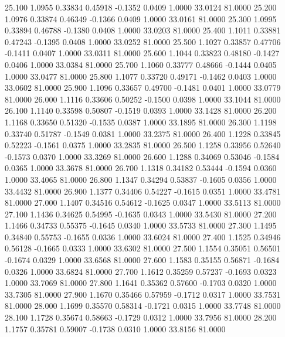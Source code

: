   25.100   1.0955   0.33834   0.45918  -0.1352   0.0409   1.0000  33.0124  81.0000
  25.200   1.0976   0.33874   0.46349  -0.1366   0.0409   1.0000  33.0161  81.0000
  25.300   1.0995   0.33894   0.46788  -0.1380   0.0408   1.0000  33.0203  81.0000
  25.400   1.1011   0.33881   0.47243  -0.1395   0.0408   1.0000  33.0252  81.0000
  25.500   1.1027   0.33857   0.47706  -0.1411   0.0407   1.0000  33.0311  81.0000
  25.600   1.1044   0.33823   0.48180  -0.1427   0.0406   1.0000  33.0384  81.0000
  25.700   1.1060   0.33777   0.48666  -0.1444   0.0405   1.0000  33.0477  81.0000
  25.800   1.1077   0.33720   0.49171  -0.1462   0.0403   1.0000  33.0602  81.0000
  25.900   1.1096   0.33657   0.49700  -0.1481   0.0401   1.0000  33.0779  81.0000
  26.000   1.1116   0.33606   0.50252  -0.1500   0.0398   1.0000  33.1044  81.0000
  26.100   1.1140   0.33598   0.50807  -0.1519   0.0393   1.0000  33.1428  81.0000
  26.200   1.1168   0.33650   0.51320  -0.1535   0.0387   1.0000  33.1895  81.0000
  26.300   1.1198   0.33740   0.51787  -0.1549   0.0381   1.0000  33.2375  81.0000
  26.400   1.1228   0.33845   0.52223  -0.1561   0.0375   1.0000  33.2835  81.0000
  26.500   1.1258   0.33956   0.52640  -0.1573   0.0370   1.0000  33.3269  81.0000
  26.600   1.1288   0.34069   0.53046  -0.1584   0.0365   1.0000  33.3678  81.0000
  26.700   1.1318   0.34182   0.53444  -0.1594   0.0360   1.0000  33.4065  81.0000
  26.800   1.1347   0.34294   0.53837  -0.1605   0.0356   1.0000  33.4432  81.0000
  26.900   1.1377   0.34406   0.54227  -0.1615   0.0351   1.0000  33.4781  81.0000
  27.000   1.1407   0.34516   0.54612  -0.1625   0.0347   1.0000  33.5113  81.0000
  27.100   1.1436   0.34625   0.54995  -0.1635   0.0343   1.0000  33.5430  81.0000
  27.200   1.1466   0.34733   0.55375  -0.1645   0.0340   1.0000  33.5733  81.0000
  27.300   1.1495   0.34840   0.55753  -0.1655   0.0336   1.0000  33.6024  81.0000
  27.400   1.1525   0.34946   0.56128  -0.1665   0.0333   1.0000  33.6302  81.0000
  27.500   1.1554   0.35051   0.56501  -0.1674   0.0329   1.0000  33.6568  81.0000
  27.600   1.1583   0.35155   0.56871  -0.1684   0.0326   1.0000  33.6824  81.0000
  27.700   1.1612   0.35259   0.57237  -0.1693   0.0323   1.0000  33.7069  81.0000
  27.800   1.1641   0.35362   0.57600  -0.1703   0.0320   1.0000  33.7305  81.0000
  27.900   1.1670   0.35466   0.57959  -0.1712   0.0317   1.0000  33.7531  81.0000
  28.000   1.1699   0.35570   0.58314  -0.1721   0.0315   1.0000  33.7748  81.0000
  28.100   1.1728   0.35674   0.58663  -0.1729   0.0312   1.0000  33.7956  81.0000
  28.200   1.1757   0.35781   0.59007  -0.1738   0.0310   1.0000  33.8156  81.0000
